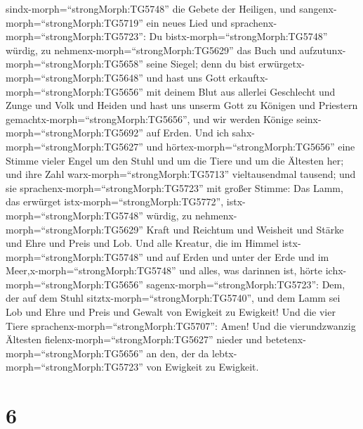 sindx-morph=``strongMorph:TG5748'' die Gebete der Heiligen, 
und sangenx-morph=``strongMorph:TG5719'' ein neues Lied und
sprachenx-morph=``strongMorph:TG5723'': Du
bistx-morph=``strongMorph:TG5748'' würdig, zu
nehmenx-morph=``strongMorph:TG5629'' das Buch und
aufzutunx-morph=``strongMorph:TG5658'' seine Siegel; denn du bist
erwürgetx-morph=``strongMorph:TG5648'' und hast uns Gott
erkauftx-morph=``strongMorph:TG5656'' mit deinem Blut aus allerlei
Geschlecht und Zunge und Volk und Heiden  und hast uns
unserm Gott zu Königen und Priestern
gemachtx-morph=``strongMorph:TG5656'', und wir werden Könige
seinx-morph=``strongMorph:TG5692'' auf Erden.  Und ich
sahx-morph=``strongMorph:TG5627'' und
hörtex-morph=``strongMorph:TG5656'' eine Stimme vieler Engel um den
Stuhl und um die Tiere und um die Ältesten her; und ihre Zahl
warx-morph=``strongMorph:TG5713'' vieltausendmal tausend; 
und sie sprachenx-morph=``strongMorph:TG5723'' mit großer Stimme: Das
Lamm, das erwürget istx-morph=``strongMorph:TG5772'',
istx-morph=``strongMorph:TG5748'' würdig, zu
nehmenx-morph=``strongMorph:TG5629'' Kraft und Reichtum und Weisheit und
Stärke und Ehre und Preis und Lob.  Und alle Kreatur, die
im Himmel istx-morph=``strongMorph:TG5748'' und auf Erden und unter der
Erde und im Meer,x-morph=``strongMorph:TG5748'' und alles, was darinnen
ist, hörte ichx-morph=``strongMorph:TG5656''
sagenx-morph=``strongMorph:TG5723'': Dem, der auf dem Stuhl
sitztx-morph=``strongMorph:TG5740'', und dem Lamm sei Lob und Ehre und
Preis und Gewalt von Ewigkeit zu Ewigkeit!  Und die vier
Tiere sprachenx-morph=``strongMorph:TG5707'': Amen! Und die
vierundzwanzig Ältesten fielenx-morph=``strongMorph:TG5627'' nieder und
betetenx-morph=``strongMorph:TG5656'' an den, der da
lebtx-morph=``strongMorph:TG5723'' von Ewigkeit zu Ewigkeit.

\hypertarget{section-5}{%
\section{6}\label{section-5}}

